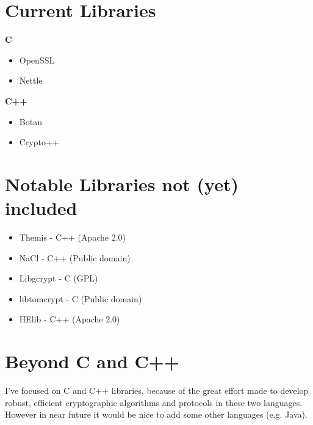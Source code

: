 \documentclass[11 pt]{article}
\begin{document}
\section{Current Libraries}
\textbf{C}
\begin{itemize}
	\item OpenSSL
	\item Nettle
\end{itemize}
\textbf{C++}
\begin{itemize}
	\item Botan
	\item Crypto++
\end{itemize}
\section{Notable Libraries not (yet) included}
\begin{itemize}
	\item Themis - C++ (Apache 2.0)
	\item NaCl - C++ (Public domain)
	\item Libgcrypt - C (GPL)
	\item libtomcrypt - C (Public domain)
	\item HElib - C++ (Apache 2.0)
\end{itemize}

\section{Beyond C and C++}
I've focused on C and C++ libraries, because of the great effort made to develop robust, efficient cryptographic algorithms and protocols in these two languages. However in near future it would be nice to add some other languages (e.g. Java).




\end{document}
